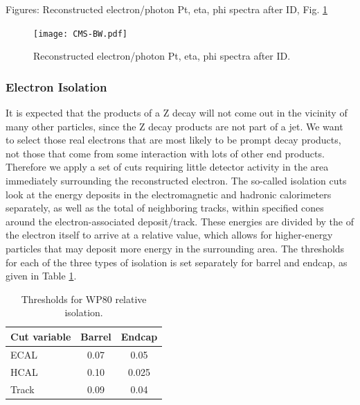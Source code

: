 Figures: Reconstructed electron/photon Pt, eta, phi spectra after ID, Fig. \ref{fig:RecoSpectraAfterEid}

 \begin{figure}[htb]
  \begin{center}
    \texttt{[image: CMS-BW.pdf]}
  \end{center}
  \caption[Reconstructed electron/photon Pt, eta, phi spectra after ID]{Reconstructed electron/photon Pt, eta, phi spectra after ID.}
  \label{fig:RecoSpectraAfterEid}
 \end{figure}


\subsubsection{Electron Isolation}

It is expected that the products of a Z decay will not come out in the vicinity of many other particles, 
since the Z decay products are not part of a jet.
We want to select those real electrons that are most likely to be prompt decay products,
not those that come from some interaction with lots of other end products.  
Therefore we apply a set of cuts requiring little detector activity in the area immediately surrounding the reconstructed electron.  
The so-called isolation cuts look at the energy deposits in the electromagnetic and hadronic calorimeters separately,
as well as the total \pt of neighboring tracks, within specified \DR cones around the electron-associated deposit/track.  
These energies are divided by the \pt of the electron itself to arrive at a relative value,
which allows for higher-energy particles that may deposit more energy in the surrounding area.  
The thresholds for each of the three types of isolation is set separately for barrel and endcap, 
as given in Table \ref{TableEisoCuts}.  


\begin{table}[htbp]
  \begin{center}
    \caption{Thresholds for WP80 relative isolation.}
    \label{TableEisoCuts}
    \begin{tabular}[]{ | l | c | c | }
      \hline
      Cut variable & Barrel & Endcap  \\ \hline \hline
      ECAL & 0.07 & 0.05  \\ \hline
      HCAL & 0.10 & 0.025  \\ \hline
      Track & 0.09 & 0.04 \\ %
      \hline
    \end{tabular}
  \end{center}
\end{table}

